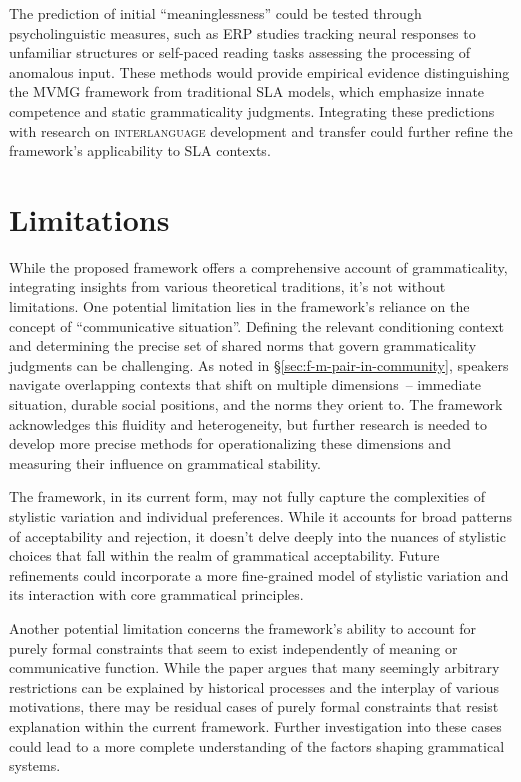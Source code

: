\documentclass[12pt,letterpaper]{article}
\newcommand{\term}[1]{\textsc{#1}}
\begin{document}
The prediction of initial \enquote{meaninglessness} could be tested through psycholinguistic measures, such as ERP studies tracking neural responses to unfamiliar structures or self-paced reading tasks assessing the processing of anomalous input. These methods would provide empirical evidence distinguishing the MVMG framework from traditional SLA models, which emphasize innate competence and static grammaticality judgments. Integrating these predictions with research on \term{interlanguage} development and transfer could further refine the framework's applicability to SLA contexts.

\section{Limitations}\label{sec:limitations}

While the proposed framework offers a comprehensive account of grammaticality, integrating insights from various theoretical traditions, it's not without limitations. One potential limitation lies in the framework's reliance on the concept of \enquote{communicative situation}. Defining the relevant conditioning context and determining the precise set of shared norms that govern grammaticality judgments can be challenging. As noted in \S\ref{sec:f-m-pair-in-community}, speakers navigate overlapping contexts that shift on multiple dimensions~-- immediate situation, durable social positions, and the norms they orient to. The framework acknowledges this fluidity and heterogeneity, but further research is needed to develop more precise methods for operationalizing these dimensions and measuring their influence on grammatical stability.

The framework, in its current form, may not fully capture the complexities of stylistic variation and individual preferences. While it accounts for broad patterns of acceptability and rejection, it doesn't delve deeply into the nuances of stylistic choices that fall within the realm of grammatical acceptability. Future refinements could incorporate a more fine-grained model of stylistic variation and its interaction with core grammatical principles.

Another potential limitation concerns the framework's ability to account for purely formal constraints that seem to exist independently of meaning or communicative function. While the paper argues that many seemingly arbitrary restrictions can be explained by historical processes and the interplay of various motivations, there may be residual cases of purely formal constraints that resist explanation within the current framework. Further investigation into these cases could lead to a more complete understanding of the factors shaping grammatical systems.
\end{document}
